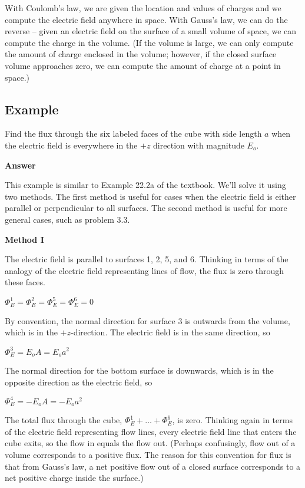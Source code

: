 \documentclass{article}
\begin{document}
With Coulomb's law, we are given the location and values of charges and we compute the electric field anywhere in space. With Gauss's law, we can do the reverse -- given an electric field on the surface of a small volume of space, we can compute the charge in the volume. (If the volume is large, we can only compute the amount of charge enclosed in the volume; however, if the closed surface volume approaches zero, we can compute the amount of charge at a point in space.)

\newpage

\subsection{Example}



Find the flux through the six labeled faces of the cube with side length $a$ when the electric field is everywhere in the $+z$ direction with magnitude $E_o$.

\textbf{Answer}

This example is similar to Example 22.2a of the textbook. We'll solve it using two methods. The first method is useful for cases when the electric field is either parallel or perpendicular to all surfaces. The second method is useful for more general cases, such as problem 3.3.

\textbf{Method I}

The electric field is parallel to surfaces 1, 2, 5, and 6. Thinking in terms of the analogy of the electric field representing lines of flow, the flux is zero through these faces. 

$\Phi_E^{1}=\Phi_E^{2}=\Phi_E^{5}=\Phi_E^{6}=0$

By convention, the normal direction for surface 3 is outwards from the volume, which is in the $+z$-direction. The electric field is in the same direction, so

$\Phi_E^{3}=E_oA=E_oa^2$

The normal direction for the bottom surface is downwards, which is in the opposite direction as the electric field, so

$\Phi_E^{4}=-E_oA=-E_oa^2$

The total flux through the cube, $\Phi_E^1+…+\Phi_E^6$, is zero. Thinking again in terms of the electric field representing flow lines, every electric field line that enters the cube exits, so the flow in equals the flow out. (Perhaps confusingly, flow out of a volume corresponds to a positive flux. The reason for this convention for flux is that from Gauss's law, a net positive flow out of a closed surface corresponds to a net positive charge inside the surface.)
\end{document}
